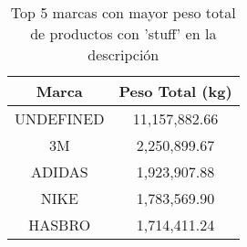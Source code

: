 \begin{table}[H]
\centering
\begin{tabular}{|c|c|}
\hline
\textbf{Marca} & \textbf{Peso Total (kg)} \\
\hline
UNDEFINED & 11,157,882.66 \\
3M & 2,250,899.67 \\
ADIDAS & 1,923,907.88 \\
NIKE & 1,783,569.90 \\
HASBRO & 1,714,411.24 \\
\hline
\end{tabular}
\caption{Top 5 marcas con mayor peso total de productos con 'stuff' en la descripción}
\end{table}